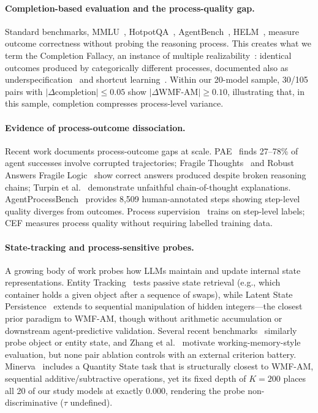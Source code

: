 \documentclass{article}
\begin{document}
\paragraph{Completion-based evaluation and the process-quality gap.}
Standard benchmarks, MMLU~\citep{hendrycks2021mmlu},
HotpotQA~\citep{yang2018hotpotqa}, AgentBench~\citep{liu2023agentbench},
HELM~\citep{liang2023helm}, measure outcome correctness without
probing the reasoning process.
This creates what we term the Completion Fallacy, an instance of multiple
realizability~\citep{putnam1967}: identical outcomes produced by
categorically different processes, documented also as
underspecification~\citep{damour2022underspecification} and shortcut
learning~\citep{geirhos2020shortcut}.
Within our 20-model sample, 30/105 pairs with
$|\Delta\text{completion}|\leq 0.05$ show $|\Delta\text{WMF-AM}|\geq 0.10$,
illustrating that, in this sample, completion compresses process-level variance.

\paragraph{Evidence of process-outcome dissociation.}
Recent work documents process-outcome gaps at scale.
PAE~\citep{xie2026m3} finds 27--78\% of agent successes involve
corrupted trajectories; Fragile Thoughts~\citep{aravindan2026fragile}
and Robust Answers Fragile Logic~\citep{jiang2026robustanswersfragilelogic}
show correct answers produced despite broken reasoning chains;
Turpin et al.~\citep{turpin2023language} demonstrate unfaithful
chain-of-thought explanations.
AgentProcessBench~\citep{fan2026agentprocessbench} provides 8,509
human-annotated steps showing step-level quality diverges from outcomes.
Process supervision~\citep{lightman2023verify,uesato2022solving} trains
on step-level labels; CEF measures process quality without
requiring labelled training data.

\paragraph{State-tracking and process-sensitive probes.}
A growing body of work probes how LLMs maintain and update internal
state representations.
Entity Tracking~\citep{entitytracking2023} tests passive state
retrieval (e.g., which container holds a given object after a
sequence of swaps), while Latent State
Persistence~\citep{huang2025language} extends to sequential
manipulation of hidden integers---the closest prior paradigm to
WMF-AM, though without arithmetic accumulation or downstream
agent-predictive validation.
Several recent benchmarks~\citep{rezaee2025statetracking,li2025howtrack}
similarly probe object or entity state, and Zhang et
al.~\citep{zhang2024working} motivate working-memory-style evaluation,
but none pair ablation controls with an external criterion battery.
Minerva~\citep{xia2025minerva} includes a Quantity State task that
is structurally closest to WMF-AM, sequential additive/subtractive
operations, yet its fixed depth of $K{=}200$ places all 20 of our
study models at exactly 0.000, rendering the probe non-discriminative
($\tau$ undefined).
\end{document}
